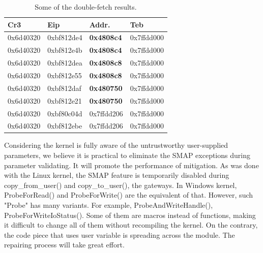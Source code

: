 \begin{center}
	\begin{table}[ht]
		\small
		\renewcommand{\arraystretch}{1.2}
		\caption{Some of the double-fetch results. }
		\label{table:doubleread}
		\centering
		\begin{tabular}{ l l l l }
			\hline
			Cr3 & Eip & Addr. & Teb \\
			\hline
			0x6d40320 & 0xbf812de4 & \textbf{0x4808c4} & 0x7ffdd000 \\
			0x6d40320 & 0xbf812e4b & \textbf{0x4808c4} & 0x7ffdd000 \\
			\hline
			0x6d40320 & 0xbf812dea & \textbf{0x4808c8} & 0x7ffdd000 \\
			0x6d40320 & 0xbf812e55 & \textbf{0x4808c8} & 0x7ffdd000 \\
			\hline
			0x6d40320 & 0xbf812daf & \textbf{0x480750} & 0x7ffdd000 \\
			0x6d40320 & 0xbf812e21 & \textbf{0x480750} & 0x7ffdd000 \\
			\hline
			0x6d40320 & 0xbf80c04d & 0x7ffdd206 & 0x7ffdd000 \\
			0x6d40320 & 0xbf812ebe & 0x7ffdd206 & 0x7ffdd000 \\
			\hline
		\end{tabular}
	\end{table}
\end{center}





Considering the kernel is fully aware of the untrustworthy user-supplied parameters, we believe it is practical to eliminate the SMAP exceptions during parameter validating. It will promote the performance of mitigation. As was done with the Linux kernel, the SMAP feature is temporarily disabled during copy\_from\_user() and copy\_to\_user(), the gateways. In Windows kernel, ProbeForRead() and ProbeForWrite() are the equivalent of that. However, such "Probe" has many variants. For example, ProbeAndWriteHandle(), ProbeForWriteIoStatus(). Some of them are macros instead of functions, making it difficult to change all of them without recompiling the kernel. On the contrary, the code piece that uses user variable is spreading across the module. The repairing process will take great effort. 

